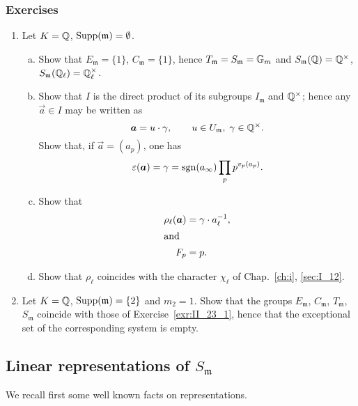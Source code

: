 \subsubsection*{Exercises}
\dpage
\begin{enumerate}[label=(\arabic*), ref=\arabic*]
\item\label{exr:II_23_1}
	Let $K = \Q$, $\Supp(\mathfrak{m}) = \emptyset$.
\begin{enumerate}[a)]
\item Show that $E_{\mathfrak{m}} = \{ 1 \}$, $C_{\mathfrak{m}} = \{ 1 \}$,
	hence $T_{\mathfrak{m}} = S_{\mathfrak{m}} = \GG_m$ and
	$S_{\mathfrak{m}}(\Q) = \Q^\times$, $S_{\mathfrak{m}}(\Q_\ell) =
	\Q_\ell^\times$.
\item Show that $I$ is the direct product of its subgroups $I_{\mathfrak{m}}$
	and $\Q^\times$; hence any $\vec a \in I$ may be written as
	\[
		\vec a = u\cdot \gamma, \qquad u \in U_{\mathfrak{m}},
		\; \gamma \in \Q^\times.
	\]
	Show that, if $\vec a = (a_p)$, one has
	\[
		\varepsilon(\vec a) = \gamma = \sgn(a_\infty) \prod_{p}
		p^{v_p(a_p)}.
	\]
\item Show that
	\begin{align*}
		\rho_\ell(\vec a) &= \gamma \cdot a_\ell^{-1}, \\
		\intertext{and}
		F_p &= p.
	\end{align*}
\item Show that $\rho_\ell$ coincides with the character $\chi_\ell$ of
	Chap.~\ref{ch:i}, \ref{sec:I_12}.
\end{enumerate}
\item\label{exr:II_23_2}
	Let $K = \Q$, $\Supp(\mathfrak{m}) = \{ 2 \}$ and $m_2 = 1$. Show that
	the groups $E_{\mathfrak{m}}$, $C_{\mathfrak{m}}$, $T_{\mathfrak{m}}$,
	$S_{\mathfrak{m}}$ coincide with those of Exercise~\ref{exr:II_23_1},
	hence that the exceptional set of the corresponding system is empty.
\end{enumerate}

\subsection{Linear representations of \texorpdfstring{$S_{\mathfrak{m}}$}{Sm}}
\label{sec:II_24}
We recall first some well known facts on representations.

